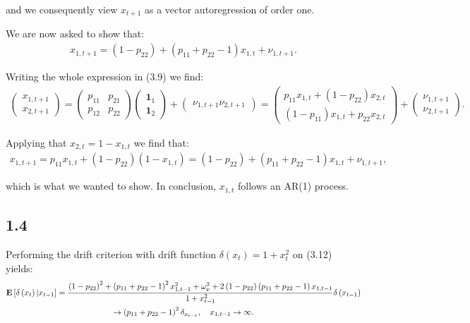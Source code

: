\documentclass[11pt,a4paper,oneside]{article}
\newcommand{\lp}{\left(}
\newcommand{\rp}{\right)}
\newcommand{\rb}{\right]}
\newcommand{\lb}{\left[}
\newcommand{\ee}{\mathbf{E}}
\newcommand{\ii}{\mathbf{1}}
\begin{document}
and we consequently view $x_{t+1}$ as a vector autoregression of order one.

We are now asked to show that:
\begin{align}
    x_{1, t+1} = \lp 1 - p_{22} \rp + \lp p_{11} + p_{22} - 1\rp x_{1,t} + \nu_{1,t+1}.
\end{align}

Writing the whole expression in (3.9) we find:
\begin{align}
    \begin{pmatrix}
        x_{1, t+1} \\
        x_{2, t+1}
    \end{pmatrix}
    =
    \begin{pmatrix}
        p_{11} & p_{21}\\
        p_{12} & p_{22}
    \end{pmatrix}
    \begin{pmatrix}
        \ii_1 \\
        \ii_2
    \end{pmatrix}
    +
    \begin{pmatrix}
        \nu_{1,t+1}
        \nu_{2,t+1}
    \end{pmatrix}
    =
    \begin{pmatrix}
        p_{11} x_{1,t} + \lp 1 - p_{22} \rp x_{2,t} \\
        \lp 1 - p_{11} \rp x_{1,t} + p_{22} x_{2,t}
    \end{pmatrix}
    +
    \begin{pmatrix}
        \nu_{1,t+1} \\
        \nu_{2,t+1}
    \end{pmatrix}.
\end{align}

Applying that $x_{2,t} = 1 - x_{1,t}$ we find that:
\begin{align}
    x_{1,t+1} = p_{11} x_{1,t} + \lp 1 - p_{22}\rp \lp 1 - x_{1,t} \rp = \lp 1 - p_{22}\rp + \lp p_{11} + p_{22} - 1\rp x_{1,t} + \nu_{1, t+1},
\end{align}

which is what we wanted to show. In conclusion, $x_{1,t}$ follows an AR(1) process.

\subsection{1.4}
Performing the drift criterion with drift function $\delta\lp x_t\rp = 1 + x_t^2$ on (3.12) yields:
\begin{gather}
    \ee\lb \delta\lp x_t\rp \vert x_{t-1}\rb 
        = \frac{\lp 1 - p_{22}\rp^2 + \lp p_{11} + p_{22} - 1\rp^2 x_{1, t-1}^2 + \omega^2_\nu + 2 \lp 1 - p_{22}\rp \lp p_{11} + p_{22} - 1\rp x_{1,t-1}}{1 + x_{t-1}^2}\delta\lp x_{t-1}\rp \notag \\
        \rightarrow \lp p_{11} + p_{22} - 1\rp^2 \delta_{x_{t-1}}, \quad x_{1,t-1}\rightarrow \infty.
\end{gather}
\end{document}
